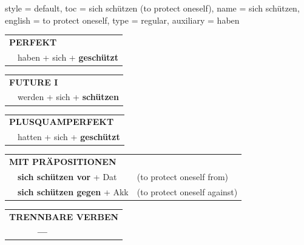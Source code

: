\begin{verbentry}{
  style = {default},
  toc = {sich schützen (to protect oneself)},
  name = {sich schützen},
  english = {to protect oneself},
  type = {regular},
  auxiliary = {haben}
}
 \begin{tabular}{rl}
     \multicolumn{2}{l}{\textbf{PERFEKT}}\\
   & haben + sich + \textbf{geschützt}\\
  \end{tabular}
\hfill
   \begin{tabular}{rl}
    \multicolumn{2}{l}{\textbf{FUTURE I} }\\
   & werden + sich + \textbf{schützen}\\
  \end{tabular}
\hfill
   \begin{tabular}{rl}
      \multicolumn{2}{l}{\textbf{PLUSQUAMPERFEKT}}\\
   & hatten + sich + \textbf{geschützt}\\
  \end{tabular}

   \vspace{10pt}

   \begin{tabular}{lll}
      \multicolumn{3}{l}{\textbf{MIT PRÄPOSITIONEN}}\\
& \textbf{sich schützen vor} + Dat & (to protect oneself from)\\
& \textbf{sich schützen gegen} + Akk & (to protect oneself against)\\
\end{tabular}
  \hfill
   \begin{tabular}{lll}
\multicolumn{3}{l}{\textbf{TRENNBARE VERBEN}}\\
& \textbf{---} & \\
\end{tabular}

  \vspace{-5pt}
\end{verbentry}


